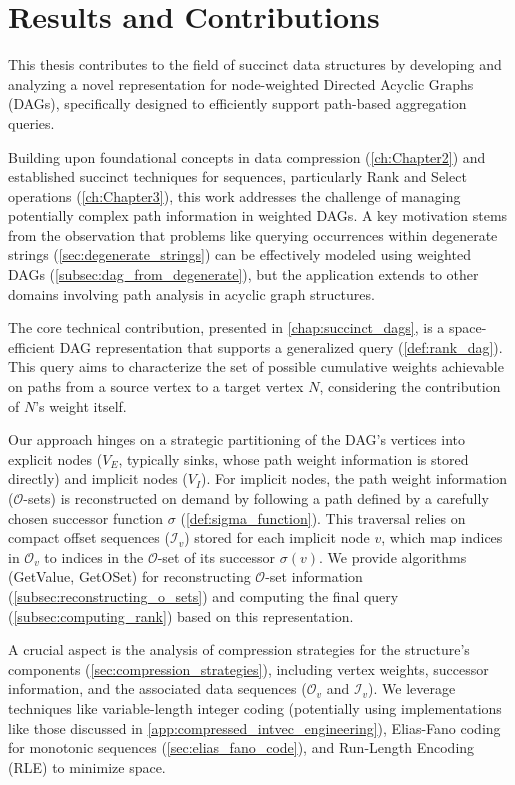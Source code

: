\section{Results and Contributions}
\label{sec:results_contributions}

This thesis contributes to the field of succinct data structures by developing and analyzing a novel representation for node-weighted Directed Acyclic Graphs (DAGs), specifically designed to efficiently support path-based aggregation queries.

Building upon foundational concepts in data compression (\autoref{ch:Chapter2}) and established succinct techniques for sequences, particularly Rank and Select operations (\autoref{ch:Chapter3}), this work addresses the challenge of managing potentially complex path information in weighted DAGs. A key motivation stems from the observation that problems like querying occurrences within degenerate strings (\autoref{sec:degenerate_strings}) can be effectively modeled using weighted DAGs (\autoref{subsec:dag_from_degenerate}), but the application extends to other domains involving path analysis in acyclic graph structures.

The core technical contribution, presented in \autoref{chap:succinct_dags}, is a space-efficient DAG representation that supports a generalized \Rank{} query (\autoref{def:rank_dag}). This query aims to characterize the set of possible cumulative weights achievable on paths from a source vertex to a target vertex $N$, considering the contribution of $N$'s weight itself.

Our approach hinges on a strategic partitioning of the DAG's vertices into explicit nodes ($V_E$, typically sinks, whose path weight information is stored directly) and implicit nodes ($V_I$). For implicit nodes, the path weight information ($\mathcal{O}$-sets) is reconstructed on demand by following a path defined by a carefully chosen successor function $\sigma$ (\autoref{def:sigma_function}). This traversal relies on compact offset sequences ($\mathcal{I}_v$) stored for each implicit node $v$, which map indices in $\mathcal{O}_v$ to indices in the $\mathcal{O}$-set of its successor $\sigma(v)$. We provide algorithms (GetValue, GetOSet) for reconstructing $\mathcal{O}$-set information (\autoref{subsec:reconstructing_o_sets}) and computing the final \Rank{} query (\autoref{subsec:computing_rank}) based on this representation.

A crucial aspect is the analysis of compression strategies for the structure's components (\autoref{sec:compression_strategies}), including vertex weights, successor information, and the associated data sequences ($\mathcal{O}_v$ and $\mathcal{I}_v$). We leverage techniques like variable-length integer coding (potentially using implementations like those discussed in \autoref{app:compressed_intvec_engineering}), Elias-Fano coding for monotonic sequences (\autoref{sec:elias_fano_code}), and Run-Length Encoding (RLE) to minimize space.

